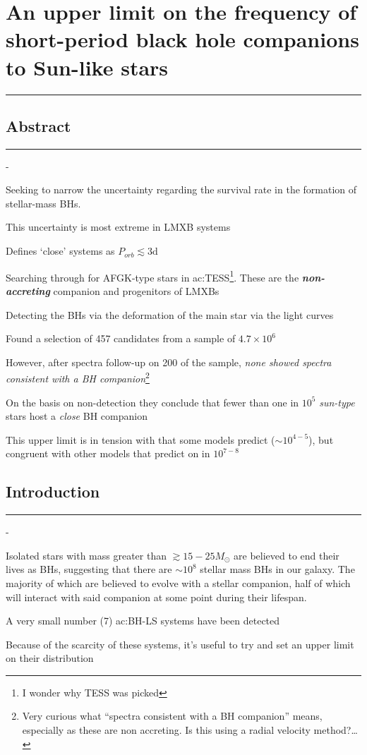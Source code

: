 \documentclass[../../mainNotes.tex]{subfiles}
\begin{document}
\fi

\pagebreak
\chapter{An upper limit on the frequency of short-period black hole companions to Sun-like stars \cite{greenUpperLimitFrequency2025}}
\hrule
\vspace{.5cm}
\section{Abstract}
\hrule
\vspace{.5cm}
\begin{list}{-}{}
\item Seeking to narrow the uncertainty regarding the survival rate in the formation of stellar-mass BHs. 
\item This uncertainty is most extreme in LMXB systems
\item Defines `close' systems as  \(P_{orb} \lesssim 3\text{d}\) 
\item Searching through for AFGK-type stars in \gls{ac:TESS}\footnote{I wonder why TESS was picked}. These are the \textit{\textbf{non-accreting}} companion and progenitors of LMXBs
\item Detecting the BHs via the deformation of the main star via the light curves 
\item Found a selection of 457 candidates from a sample of \(4.7 \times 10^6\)
\item However, after spectra follow-up on 200 of the sample, \textit{none showed spectra consistent with a BH companion}\footnote{Very curious what ``spectra consistent with a BH companion'' means, especially as these are non accreting. Is this using a radial velocity method?\dots}
\item On the basis on non-detection they conclude that fewer than one in \(10^5\) \textit{sun-type} stars host a \textit{close} BH companion
\item This upper limit is in tension with that some models predict (\(\sim10^{4-5}\)), but congruent with other models that predict on in \(10^{7-8}\)
\end{list}

\pagebreak
\section{Introduction}
\hrule
\vspace{.5cm}
\begin{list}{-}{}
\item Isolated stars with mass greater than \(\gtrsim 15-25 M_\odot\) are believed to end their lives as BHs, suggesting that there are \(\sim 10^8\) stellar mass BHs in our galaxy. The majority of which are believed to evolve with a stellar companion, half of which will interact with said companion at some point during their lifespan.
\item A very small number (7) \gls{ac:BH-LS} systems have been detected
\item Because of the scarcity of these systems, it's useful to try and set an upper limit on their distribution
\end{list}

\ifdefined\AnMainDocument\else
\end{document}
